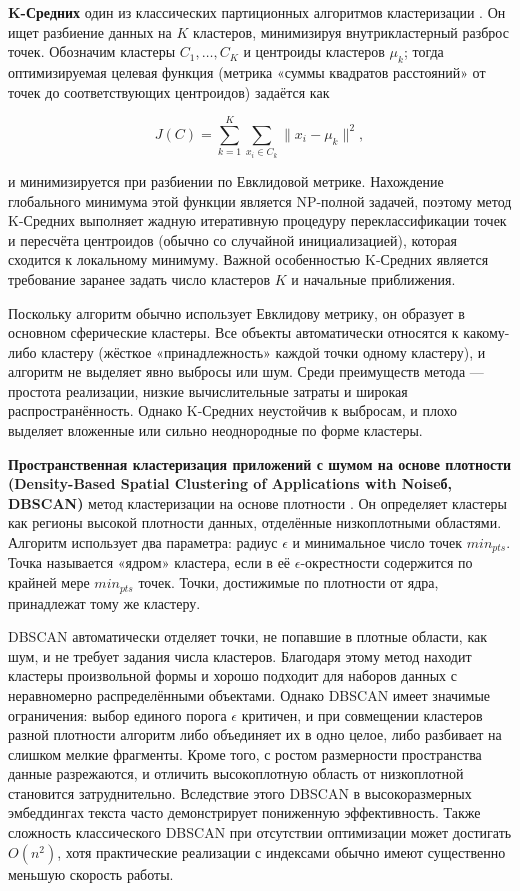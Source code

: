\textbf{K-Средних} один из классических партиционных алгоритмов кластеризации \parencite{kmeans2010data}.
Он ищет разбиение данных на $K$ кластеров, минимизируя внутрикластерный разброс точек. Обозначим кластеры
$C_1,\dots,C_K$ и центроиды кластеров $\mu_k$; тогда оптимизируемая целевая функция (метрика «суммы
квадратов расстояний» от точек до соответствующих центроидов) задаётся как

\begin{equation}
    J(C)= \sum_{k=1}^K \sum_{x_i \in C_k} \|x_i - \mu_k\|^2,
\end{equation}

и минимизируется при разбиении по Евклидовой метрике. Нахождение глобального минимума этой функции является
NP-полной задачей, поэтому метод K-Средних выполняет жадную итеративную процедуру переклассификации точек
и пересчёта центроидов (обычно со случайной инициализацией), которая сходится к локальному минимуму. Важной
особенностью K-Средних является требование заранее задать число кластеров $K$ и начальные приближения.

Поскольку алгоритм обычно использует Евклидову метрику, он образует в основном сферические кластеры.
Все объекты автоматически относятся к какому-либо кластеру (жёсткое «принадлежность» каждой точки
одному кластеру), и алгоритм не выделяет явно выбросы или шум. Среди преимуществ метода --- простота
реализации, низкие вычислительные затраты и широкая распространённость. Однако K-Средних неустойчив
к выбросам, и плохо выделяет вложенные или сильно неоднородные по форме кластеры.

\textbf{Пространственная кластеризация приложений с шумом на основе плотности (Density-Based Spatial
Clustering of Applications with Noiseб, DBSCAN)} метод кластеризации на основе плотности \parencite{DBSCAN1996}.
Он определяет кластеры как регионы высокой плотности данных, отделённые низкоплотными областями. Алгоритм использует
два параметра: радиус $\epsilon$ и минимальное число точек $min_{pts}$. Точка называется «ядром» кластера, если
в её $\epsilon$-окрестности содержится по крайней мере $min_{pts}$ точек. Точки, достижимые по плотности
от ядра, принадлежат тому же кластеру.

DBSCAN автоматически отделяет точки, не попавшие в плотные области, как шум, и не требует задания числа кластеров.
Благодаря этому метод находит кластеры произвольной формы и хорошо подходит для наборов данных с неравномерно
распределёнными объектами. Однако DBSCAN имеет значимые ограничения: выбор единого порога $\epsilon$ критичен,
и при совмещении кластеров разной плотности алгоритм либо объединяет их в одно целое, либо разбивает на слишком
мелкие фрагменты. Кроме того, с ростом размерности пространства данные разрежаются, и отличить высокоплотную
область от низкоплотной становится затруднительно. Вследствие этого DBSCAN в высокоразмерных эмбеддингах текста
часто демонстрирует пониженную эффективность. Также сложность классического DBSCAN при отсутствии оптимизации
может достигать $O(n^2)$, хотя практические реализации с индексами обычно имеют существенно меньшую скорость работы.

